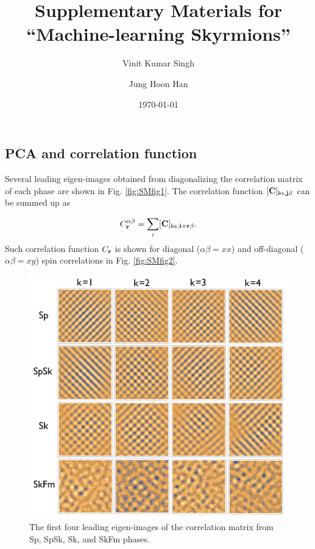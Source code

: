 \documentclass[reprint,amsmath,amssymb,aps,showpacs,onecolumn,superscriptaddress,prb]{revtex4-1}
\newcommand{\ba}{\begin{eqnarray}}
\newcommand{\ea}{\end{eqnarray}}
\renewcommand{\v}[1]{{\bf #1}}
\begin{document}
\title{Supplementary Materials for ``Machine-learning Skyrmions''}

\author{Vinit Kumar Singh}
\author{Jung Hoon Han}
\date{\today}
\maketitle
\begin{widetext}

\section{PCA and correlation function}

Several leading eigen-images obtained from diagonalizing the correlation matrix of each phase are shown in Fig. \ref{fig:SMfig1}. The correlation function $[\bf C]_{i\alpha, j\beta}$ can be summed up as

\ba C_{\v r}^{\alpha\beta} = \sum_i [\bf C]_{i\alpha, i+\v r \beta} .\ea
Such correlation function $C_{\v r}$ is shown for diagonal ($\alpha\beta=xx$) and off-diagonal ($\alpha\beta=xy$) spin correlations in Fig. \ref{fig:SMfig2}.

\begin{figure}[ht]
\includegraphics[scale=0.35]{SMfig1.png}
\caption{The first four leading eigen-images of the correlation matrix from Sp, SpSk, Sk, and SkFm phases.}\label{fig:SM1}
\end{figure}


\end{widetext}
\end{document}
